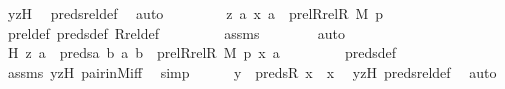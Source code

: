 \begin{isabellebody}
\ yzH\ \isamarkupfalse%
\ preds{\isacharunderscore}{\kern0pt}rel{\isacharunderscore}{\kern0pt}def\ \isamarkupfalse%
\ auto\ \isanewline
\ \ \ \ \isamarkupfalse%
\ \isamarkupfalse%
\ {\isachardoublequoteopen}{\isacharless}{\kern0pt}{\isacharless}{\kern0pt}z{\isacharcomma}{\kern0pt}\ a{\isachargreater}{\kern0pt}{\isacharcomma}{\kern0pt}\ {\isacharless}{\kern0pt}x{\isacharcomma}{\kern0pt}\ a{\isachargreater}{\kern0pt}{\isachargreater}{\kern0pt}\ {\isasymin}\ prel{\isacharparenleft}{\kern0pt}Rrel{\isacharparenleft}{\kern0pt}R{\isacharcomma}{\kern0pt}\ M{\isacharparenright}{\kern0pt}{\isacharcomma}{\kern0pt}\ p{\isacharparenright}{\kern0pt}{\isachardoublequoteclose}\ \isanewline
\ \ \ \ \ \ \isamarkupfalse%
\ prel{\isacharunderscore}{\kern0pt}def\ preds{\isacharunderscore}{\kern0pt}def\ Rrel{\isacharunderscore}{\kern0pt}def\ \isanewline
\ \ \ \ \ \ \isamarkupfalse%
\ assms\isanewline
\ \ \ \ \ \ \isamarkupfalse%
\ auto\ \isanewline
\ \ \ \ \isamarkupfalse%
\ \isamarkupfalse%
\ H{}{\isacharcolon}{\kern0pt}\ {\isachardoublequoteopen}{\isasymlangle}z{\isacharcomma}{\kern0pt}\ a{\isasymrangle}\ {\isasymin}\ preds{\isacharparenleft}{\kern0pt}{\isasymlambda}a\ b{\isachardot}{\kern0pt}\ {\isasymlangle}a{\isacharcomma}{\kern0pt}\ b{\isasymrangle}\ {\isasymin}\ prel{\isacharparenleft}{\kern0pt}Rrel{\isacharparenleft}{\kern0pt}R{\isacharcomma}{\kern0pt}\ M{\isacharparenright}{\kern0pt}{\isacharcomma}{\kern0pt}\ p{\isacharparenright}{\kern0pt}{\isacharcomma}{\kern0pt}\ {\isasymlangle}x{\isacharcomma}{\kern0pt}\ a{\isasymrangle}{\isacharparenright}{\kern0pt}{\isachardoublequoteclose}\ \isanewline
\ \ \ \ \ \ \isamarkupfalse%
\ preds{\isacharunderscore}{\kern0pt}def\ \isamarkupfalse%
\ assms\ yzH\ pair{\isacharunderscore}{\kern0pt}in{\isacharunderscore}{\kern0pt}M{\isacharunderscore}{\kern0pt}iff\ \isamarkupfalse%
\ simp\isanewline
\isanewline
\ \ \ \ \isamarkupfalse%
\ {\isachardoublequoteopen}y\ {\isasymin}\ preds{\isacharparenleft}{\kern0pt}R{\isacharcomma}{\kern0pt}\ x{\isacharparenright}{\kern0pt}\ {\isasymunion}\ {\isacharbraceleft}{\kern0pt}x{\isacharbraceright}{\kern0pt}{\isachardoublequoteclose}\ \isamarkupfalse%
\ yzH\ preds{\isacharunderscore}{\kern0pt}rel{\isacharunderscore}{\kern0pt}def\ \isamarkupfalse%
\ auto\ \isanewline
\ \ \ \ \isamarkupfalse%
\ \isamarkupfalse%

\end{isabellebody}
